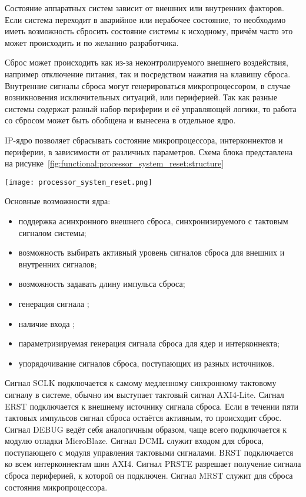 Состояние аппаратных систем зависит от внешних или внутренних факторов. Если система переходит в
аварийное или нерабочее состояние, то необходимо иметь возможность сбросить состояние системы к
исходному, причём часто это может происходить и по желанию разработчика.

Сброс может происходить как из-за неконтролируемого внешнего воздействия, например отключение
питания, так и посредством нажатия на клавишу сброса. Внутренние сигналы сброса могут генерироваться
микропроцессором, в случае возникновения исключительных ситуаций, или периферией. Так как
разные системы содержат разный набор периферии и её управляющей логики, то работа со сбросом
может быть обобщена и вынесена в отдельное ядро.

IP-ядро  позволяет сбрасывать состояние микропроцессора, интерконнектов
и периферии, в зависимости от различных параметров. Схема блока представлена на рисунке~\ref{fig:functional:processor_system_reset:structure}

\begin{center}
  \centering
  \texttt{[image: processor\_system\_reset.png]}
  \label{fig:functional:processor_system_reset:structure}
\end{center}

Основные возможности ядра:
\begin{itemize}
  \item поддержка асинхронного внешнего сброса, синхронизируемого с тактовым сигналом системы;
  \item возможность выбирать активный уровень сигналов сброса для внешних и внутренних сигналов;
  \item возможность задавать длину импульса сброса;
  \item генерация сигнала ;
  \item наличие входа ;
  \item параметризируемая генерация сигнала сброса для ядер и интерконнекта;
  \item упорядочивание сигналов сброса, поступающих из разных источников.
\end{itemize}

Сигнал SCLK подключается к самому медленному синхронному тактовому сигналу в системе,
обычно им выступает тактовый сигнал AXI4-Lite. Сигнал ERST подключается к
внешнему источнику сигнала сброса. Если в течении пяти тактовых импульсов сигнал
сброса остаётся активным, то происходит сброс. Сигнал DEBUG ведёт себя аналогичным образом,
чаще всего подключается к модулю отладки MicroBlaze. Сигнал DCML служит входом для сброса,
поступающего с модуля управления тактовыми сигналами. BRST подключается ко всем интерконнектам
шин AXI4. Сигнал PRSTE разрешает получение сигнала сброса периферией, к которой он подключен.
Сигнал MRST служит для сброса состояния микропроцессора.

